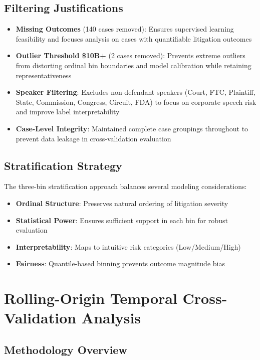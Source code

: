 \documentclass[11pt]{article}
\begin{document}
\subsection{Filtering Justifications}

\begin{itemize}
\item \textbf{Missing Outcomes} (140 cases removed): Ensures supervised learning feasibility and focuses analysis on cases with quantifiable litigation outcomes
\item \textbf{Outlier Threshold \$10B+} (2 cases removed): Prevents extreme outliers from distorting ordinal bin boundaries and model calibration while retaining representativeness
\item \textbf{Speaker Filtering}: Excludes non-defendant speakers (Court, FTC, Plaintiff, State, Commission, Congress, Circuit, FDA) to focus on corporate speech risk and improve label interpretability
\item \textbf{Case-Level Integrity}: Maintained complete case groupings throughout to prevent data leakage in cross-validation evaluation
\end{itemize}

\subsection{Stratification Strategy}

The three-bin stratification approach balances several modeling considerations:
\begin{itemize}
\item \textbf{Ordinal Structure}: Preserves natural ordering of litigation severity
\item \textbf{Statistical Power}: Ensures sufficient support in each bin for robust evaluation
\item \textbf{Interpretability}: Maps to intuitive risk categories (Low/Medium/High)
\item \textbf{Fairness}: Quantile-based binning prevents outcome magnitude bias
\end{itemize}



\section{Rolling-Origin Temporal Cross-Validation Analysis}

\subsection{Methodology Overview}
\end{document}
